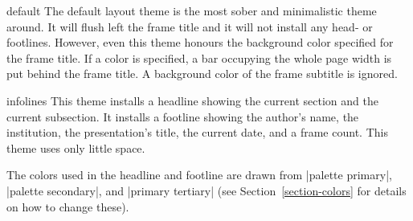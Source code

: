 \begin{outerthemeexample}{default}
  The default layout theme is the most sober and minimalistic theme
  around. It will flush left the frame title and it will not install
  any head- or footlines. However, even this theme honours the
  background color specified for the frame title. If a color is
  specified, a bar occupying the whole page width is put behind the
  frame title. A background color of the frame subtitle is ignored.
\end{outerthemeexample}

\begin{outerthemeexample}{infolines}
  This theme installs a headline showing the current section and the
  current subsection. It installs a footline showing the author's
  name, the institution, the presentation's title, the current date,
  and a frame count. This theme uses only little space.

  The colors used in the headline and footline are drawn from
  |palette primary|, |palette secondary|, and |primary tertiary| (see
  Section~\ref{section-colors} for details on how to change these).
\end{outerthemeexample}

